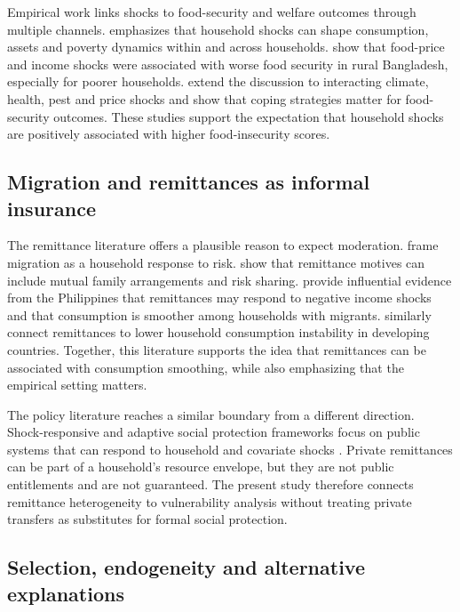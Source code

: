 \documentclass[11pt]{article}
\begin{document}
Empirical work links shocks to food-security and welfare outcomes through multiple channels. \textcite{Hoddinott2006} emphasizes that household shocks can shape consumption, assets and poverty dynamics within and across households. \textcite{AkterBasher2014} show that food-price and income shocks were associated with worse food security in rural Bangladesh, especially for poorer households. \textcite{Ansah2021} extend the discussion to interacting climate, health, pest and price shocks and show that coping strategies matter for food-security outcomes. These studies support the expectation that household shocks are positively associated with higher food-insecurity scores.

\subsection{Migration and remittances as informal insurance}

The remittance literature offers a plausible reason to expect moderation. \textcite{StarkLevhari1982} frame migration as a household response to risk. \textcite{LucasStark1985} show that remittance motives can include mutual family arrangements and risk sharing. \textcite{ChoiYang2007} provide influential evidence from the Philippines that remittances may respond to negative income shocks and that consumption is smoother among households with migrants. \textcite{CombesEbeke2011} similarly connect remittances to lower household consumption instability in developing countries. Together, this literature supports the idea that remittances can be associated with consumption smoothing, while also emphasizing that the empirical setting matters.

The policy literature reaches a similar boundary from a different direction. Shock-responsive and adaptive social protection frameworks focus on public systems that can respond to household and covariate shocks \parencite{OBrien2018,Bowen2020}. Private remittances can be part of a household's resource envelope, but they are not public entitlements and are not guaranteed. The present study therefore connects remittance heterogeneity to vulnerability analysis without treating private transfers as substitutes for formal social protection.

\subsection{Selection, endogeneity and alternative explanations}
\end{document}
